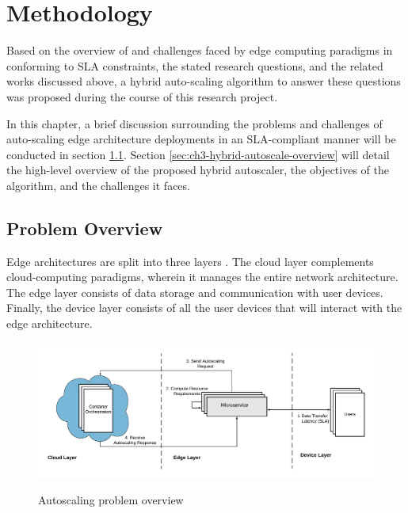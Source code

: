 \clearpage

\def\chaptertitle{Methodology}

\lhead{\emph{\chaptertitle}}

\chapter{\chaptertitle}
\label{ch:methodology}

Based on the overview of and challenges faced by edge computing paradigms in conforming to SLA constraints, the stated research questions, and the related works discussed above, a hybrid auto-scaling algorithm to answer these questions was proposed during the course of this research project.\par

In this chapter, a brief discussion surrounding the problems and challenges of auto-scaling edge architecture deployments in an SLA-compliant manner will be conducted in section \ref{sec:ch3-problem-overview}. Section \ref{sec:ch3-hybrid-autoscale-overview} will detail the high-level overview of the proposed hybrid autoscaler, the objectives of the algorithm, and the challenges it faces.

\section{Problem Overview}
\label{sec:ch3-problem-overview}

Edge architectures are split into three layers \cite{hamdan2020edge}. 
The cloud layer complements cloud-computing paradigms, wherein it manages the entire network architecture. The edge layer consists of data storage and communication with user devices. Finally, the device layer consists of all the user devices that will interact with the edge architecture.\par

\begin{figure}[htb]
    \centering
    \caption{Autoscaling problem overview}
    \includegraphics[width=0.8\linewidth]{Figures/Problem-Overview.pdf}
    \label{fig:autoscaling-problem-overview}
\end{figure}

